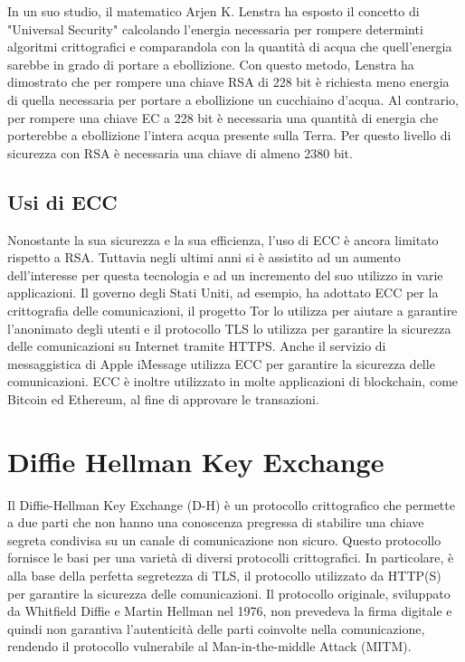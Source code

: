 \documentclass{article}
\begin{document}
In un suo studio, il matematico Arjen K. Lenstra ha esposto il concetto di "Universal Security" calcolando l'energia necessaria per rompere determinti algoritmi crittografici e comparandola con la quantità di acqua che quell'energia sarebbe in grado di portare a ebollizione.
Con questo metodo, Lenstra ha dimostrato che per rompere una chiave RSA di 228 bit è richiesta meno energia di quella necessaria per portare a ebollizione un cucchiaino d'acqua.
Al contrario, per rompere una chiave EC a 228 bit è necessaria una quantità di energia che porterebbe a ebollizione l'intera acqua presente sulla Terra.
Per questo livello di sicurezza con RSA è necessaria una chiave di almeno 2380 bit.

\subsection{Usi di ECC}
Nonostante la sua sicurezza e la sua efficienza, l'uso di ECC è ancora limitato rispetto a RSA.
Tuttavia negli ultimi anni si è assistito ad un aumento dell'interesse per questa tecnologia e ad un incremento del suo utilizzo in varie applicazioni.
Il governo degli Stati Uniti, ad esempio, ha adottato ECC per la crittografia delle comunicazioni, il progetto Tor lo utilizza per aiutare a garantire l'anonimato degli utenti e il protocollo TLS lo utilizza per garantire la sicurezza delle comunicazioni su Internet tramite HTTPS.
Anche il servizio di messaggistica di Apple iMessage utilizza ECC per garantire la sicurezza delle comunicazioni. ECC è inoltre utilizzato in molte applicazioni di blockchain, come Bitcoin ed Ethereum, al fine di approvare le transazioni.

\section{Diffie Hellman Key Exchange}
Il Diffie-Hellman Key Exchange (D-H) è un protocollo crittografico che permette a due parti che non hanno una conoscenza pregressa di stabilire una chiave segreta condivisa su un canale di comunicazione non sicuro.
Questo protocollo fornisce le basi per una varietà di diversi protocolli crittografici. In particolare, è alla base della perfetta segretezza di TLS, il protocollo utilizzato da HTTP(S) per garantire la sicurezza delle comunicazioni.
Il protocollo originale, sviluppato da Whitfield Diffie e Martin Hellman nel 1976, non prevedeva la firma digitale e quindi non garantiva l'autenticità delle parti coinvolte nella comunicazione, rendendo il protocollo vulnerabile al Man-in-the-middle Attack (MITM).
\end{document}
